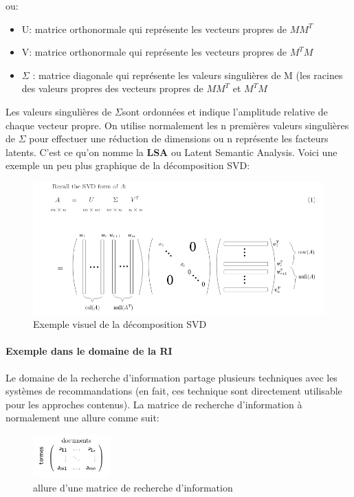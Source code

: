\documentclass[oneside]{book}
\begin{document}
ou:
\begin{itemize}
\item U: matrice orthonormale qui représente les vecteurs propres de $MM^T$
\item V: matrice orthonormale qui représente les vecteurs propres de $M^TM$
\item $\Sigma$ : matrice diagonale qui représente les valeurs singulières de M (les racines des valeurs propres des vecteurs propres de $MM^T$ et $M^TM$
\end{itemize}

Les valeurs singulières de $\Sigma$sont ordonnées et indique l'amplitude relative de chaque vecteur propre. On utilise normalement les n premières valeurs singulières de  $\Sigma$ pour effectuer une réduction de dimensions ou n représente les facteurs latents. C'est ce qu'on nomme la \textbf{LSA} ou  Latent Semantic Analysis. Voici une exemple un peu plus graphique de la décomposition SVD:\\

\begin{figure}[!ht]
\centering
\includegraphics[width = \linewidth]{SVD.png}
\caption{Exemple visuel de la décomposition SVD}
\label{fig:SVD}
\end{figure}




\paragraph{Exemple dans le domaine de la RI}
Le domaine de la recherche d'information partage plusieurs techniques avec les systèmes de recommandations (en fait, ces technique sont directement utilisable pour les approches contenus). La matrice de recherche d'information à normalement une allure comme suit:\\

\begin{figure}[!ht]
\centering
\includegraphics[width = 3cm]{recherche_information.png}
\caption{allure d'une matrice de recherche d'information}
\label{fig:recherche_information}
\end{figure}
\end{document}
